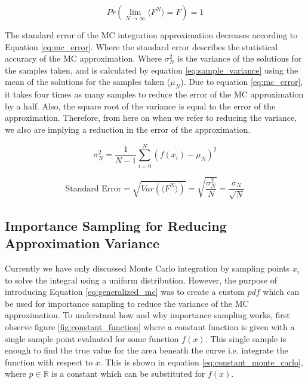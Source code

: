 \documentclass[../dissertation.tex]{subfiles}
\begin{document}
\begin{equation}
\label{eq:law_large_numbers}
Pr( \lim_{N \rightarrow \infty} \langle F^N \rangle = F ) = 1
\end{equation}

The standard error of the MC integration approximation decreases according to Equation \ref{eq:mc_error}. Where the standard error describes the statistical accuracy of the MC approximation. Where $\sigma_N^2$ is the variance of the solutions for the samples taken, and is calculated by equation \ref{eq:sample_variance} using the mean of the solutions for the samples taken ($\mu_N$). Due to equation \ref{eq:mc_error}, it takes four times as many samples to reduce the error of the MC approximation by a half. Also, the square root of the variance is equal to the error of the approximation. Therefore, from here on when we refer to reducing the variance, we also are implying a reduction in the error of the approximation.

\begin{equation}
\label{eq:sample_variance}
\sigma_N^2 = \frac{1}{N-1} \sum_{i=0}^N (f(x_i) - \mu_N)^2
\end{equation}

\begin{equation}
\label{eq:mc_error}
\text{Standard Error} = \sqrt{Var(\langle F^N \rangle)} = \sqrt{\frac{\sigma_N^2}{N}} = \frac{\sigma_N}{\sqrt{N}}
\end{equation}

\subsection{Importance Sampling for Reducing Approximation Variance}
\label{sec:importance_sampling}

Currently we have only discussed Monte Carlo integration by sampling points $x_i$ to solve the integral using a uniform distribution. However, the purpose of introducing Equation \ref{eq:generalized_mc} was to create a custom $pdf$ which can be used for importance sampling to reduce the variance of the MC approximation. To understand how and why importance sampling works, first observe figure \ref{fig:constant_function} where a constant function is given with a single sample point evaluated for some function $f(x)$. This single sample is enough to find the true value for the area beneath the curve i.e. integrate the function with respect to $x$. This is shown in equation \ref{eq:constant_monte_carlo}, where $p \in \mathbb{R}$ is a constant which can be substituted for $f(x)$.
\end{document}
